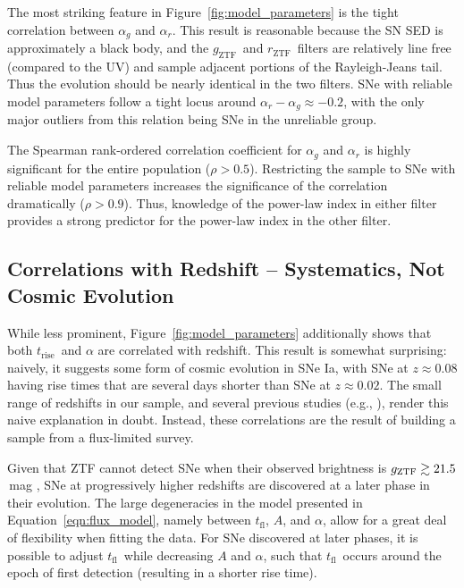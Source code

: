 \documentclass[twocolumn]{./aastex63}
\newcommand{\rztf}{$r_\mathrm{ZTF}$}
\newcommand{\gztf}{$g_\mathrm{ZTF}$}
\newcommand{\tfl}{$t_\mathrm{fl}$}
\newcommand{\trise}{$t_\mathrm{rise}$}
\begin{document}
The most striking feature in Figure~\ref{fig:model_parameters} is the tight
correlation between $\alpha_g$ and $\alpha_r$. This result is
reasonable because the SN SED is approximately a
black body, and the \gztf\ and \rztf\ filters are relatively line free
(compared to the UV) and sample adjacent portions of the Rayleigh-Jeans tail.
Thus the evolution should be nearly identical in the two filters. SNe with
reliable model parameters follow a tight locus around $\alpha_r - \alpha_g
\approx -0.2$, with the only major outliers from this relation being SNe in
the unreliable group.

The Spearman rank-ordered correlation coefficient for $\alpha_g$ and
$\alpha_r$ is highly significant for the entire population ($\rho > 0.5$).
Restricting the sample to SNe with reliable model parameters increases the
significance of the correlation dramatically ($\rho > 0.9$). Thus, knowledge
of the power-law index in either filter provides a strong predictor for the
power-law index in the other filter.

\subsection{Correlations with Redshift -- Systematics, Not Cosmic Evolution}\label{sec:redshift_correlations}

While less prominent, Figure~\ref{fig:model_parameters} additionally shows
that both \trise\ and $\alpha$ are correlated with redshift. This result is
somewhat surprising: naively, it suggests some form of cosmic evolution in SNe
Ia, with SNe at $z \approx 0.08$ having rise times that are several days
shorter than SNe at $z \approx 0.02$. The small range of redshifts in our
sample, and several previous studies (e.g.,
\citealt{Aldering00,Conley06,Jones19}), render this naive explanation in
doubt. Instead, these correlations are the result of building a sample from a
flux-limited survey.

Given that ZTF cannot detect SNe when their observed brightness is
$g_\mathrm{ZTF} \gtrsim 21.5$\,mag \citep{Masci19,Bellm19}, SNe at progressively
higher redshifts are discovered at a later phase in their evolution. The large
degeneracies in the model presented in Equation~\ref{eqn:flux_model}, namely
between \tfl, $A$, and $\alpha$, allow for a great deal of flexibility when
fitting the data. For SNe discovered at later phases, it is possible to adjust
\tfl\ while decreasing $A$ and $\alpha$, such that \tfl\ occurs around the
epoch of first detection (resulting in a shorter rise time).
\end{document}
